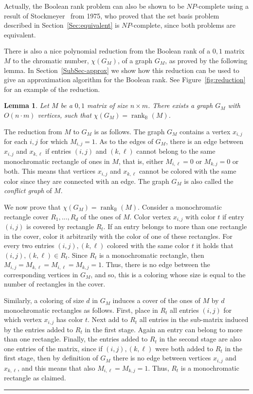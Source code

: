 \documentclass[11pt]{article}
\newtheorem{lemma}[theorem]{Lemma}
\newcommand{\qedsymb}{\hfill{\rule{2mm}{2mm}}}
\renewenvironment{proof}[1][]{\begin{trivlist}
\item[\hspace{\labelsep}{\bf\noindent Proof#1:\/}] }{\qedsymb\end{trivlist}}
\newcommand{\rank}{\mathop{\mathrm{rank}}}
\newcommand{\Rbool}{{\rank}_\mathbb{B}}
\begin{document}
Actually, the Boolean rank problem can also be shown to be $NP$-complete  using a result of Stockmeyer~\cite{stockmeyer1975set} from 1975,
who proved that the set basis problem described in Section~\ref{Sec:equivalent} is $NP$-complete, since  both problems are equivalent.

There is also a nice polynomial reduction from the Boolean rank of a  $0,1$ matrix $M$  to the chromatic number, $\chi(G_M)$, of a graph $G_M$, as proved by the following lemma.
In Section~\ref{SubSec-approx} we show how this reduction can be used to give an approximation algorithm for the Boolean rank.
See Figure~\ref{fig:reduction} for an example of the reduction.


\begin{lemma}
\label{lem-boolean-color}
Let $M$ be a $0,1$ matrix of size $n \times m$. There exists a graph $G_M$ with $O(n\cdot m)$ vertices, such that  $\chi(G_M) = \Rbool(M)$.
\end{lemma}
\begin{proof}
The reduction from $M$ to $G_M$ is as follows. The graph $G_M$ contains a vertex $x_{i,j}$ for each $i,j$ for which $M_{i,j} = 1$.
As to the edges of $G_M$, there is an edge between $x_{i,j}$ and $x_{k,\ell}$ if entries $(i,j)$ and $(k,\ell)$ cannot
belong to the same monochromatic rectangle of ones in $M$, that is, either $M_{i,\ell} = 0$ or $M_{k,j} = 0$ or both.
This means that vertices $x_{i,j}$ and $x_{k,\ell}$ cannot be colored with the same color since they are connected with an edge.
The graph $G_M$ is also called the {\em conflict graph} of $M$.

We now prove that $\chi(G_M) = \Rbool(M)$.
Consider a monochromatic rectangle cover $R_1,...,R_d$ of the ones of $M$.
Color vertex $x_{i,j}$ with color $t$ if entry $(i,j)$ is covered by rectangle $R_t$.
If an entry belongs to more than one  rectangle in the cover, color it arbitrarily with the color of one of these rectangles.
For every two entries $(i,j),(k,\ell)$ colored with the same color $t$ it holds that $(i,j),(k,\ell)\in R_t$.
Since $R_t$ is a monochromatic rectangle, then $M_{i,j} = M_{k,\ell} = M_{i,\ell} = M_{k,j} = 1$.
Thus, there is no edge between the corresponding vertices in $G_M$, and so, this is a coloring whose size is equal to the number of rectangles in the cover.

Similarly, a coloring of size $d$ in $G_M$  induces a cover of the ones of $M$ by $d$ monochromatic rectangles as follows.
First, place in $R_t$ all entries $(i,j)$ for which vertex $x_{i,j}$ has color $t$.
Next add to $R_t$ all entries in the sub-matrix induced by the entries added to $R_t$ in the first stage. Again an entry can belong to more than one rectangle.
Finally, the entries added to $R_t$ in the second stage are also one entries of the matrix,
since if $(i,j), (k,\ell)$ were both added to $R_t$ in the first stage,
then by definition of $G_M$ there is no edge between vertices $x_{i,j}$ and $x_{k,\ell}$,
and this means that also $M_{i,\ell} = M_{k,j} = 1$. Thus, $R_t$ is a monochromatic rectangle as claimed.
\end{proof}
\end{document}
